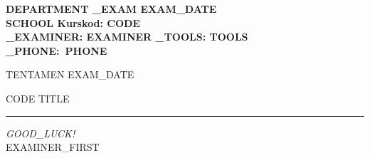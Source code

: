 \documentclass[a4paper,11pt]{article}
\begin{document}
\footnotesize
\bf\noindent
DEPARTMENT \hfill _EXAM EXAM_DATE \\
SCHOOL \hfill Kurskod: CODE \\
_EXAMINER: EXAMINER \hfill _TOOLS: TOOLS \\
_PHONE:~PHONE

\linespread{1.5}

\bigskip

\begin{center}

  \Large\bf

  TENTAMEN EXAM_DATE

  \smallskip

  CODE TITLE

  \bigskip

\end{center}

\rm
\large

\hrule

\smallskip

\noindent


\bigskip

{\emph{GOOD_LUCK!} \\[1em] EXAMINER_FIRST}

\newpage
\end{document}
